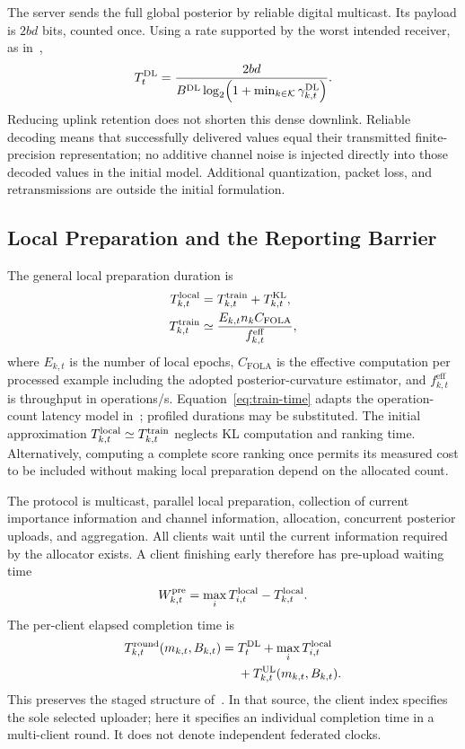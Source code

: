 The server sends the full global posterior by reliable digital multicast. Its payload is $2bd$ bits, counted once. Using a rate supported by the worst intended receiver, as in~\cite[Eqs.~(4)--(5)]{scheduling},
\begin{equation}
 T_t^{\mathrm{DL}}=\frac{2bd}{B^{\mathrm{DL}}\log_2\!\left(
 1+\min_{k\in\mathcal K}\gamma_{k,t}^{\mathrm{DL}}\right)}.
 \label{eq:downlink-time}
\end{equation}
Reducing uplink retention does not shorten this dense downlink. Reliable decoding means that successfully delivered values equal their transmitted finite-precision representation; no additive channel noise is injected directly into those decoded values in the initial model. Additional quantization, packet loss, and retransmissions are outside the initial formulation.

\subsection{Local Preparation and the Reporting Barrier}
The general local preparation duration is
\begin{align}
 T_{k,t}^{\mathrm{local}}
 &=T_{k,t}^{\mathrm{train}}+T_{k,t}^{\mathrm{KL}},\label{eq:local-time}\\
 T_{k,t}^{\mathrm{train}}
 &\simeq\frac{E_{k,t}n_kC_{\mathrm{FOLA}}}
 {f_{k,t}^{\mathrm{eff}}},\label{eq:train-time}
\end{align}
where $E_{k,t}$ is the number of local epochs, $C_{\mathrm{FOLA}}$ is the effective computation per processed example including the adopted posterior-curvature estimator, and $f_{k,t}^{\mathrm{eff}}$ is throughput in operations/s. Equation~\eqref{eq:train-time} adapts the operation-count latency model in~\cite[Eq.~(16)]{scheduling}; profiled durations may be substituted. The initial approximation $T_{k,t}^{\mathrm{local}}\simeq T_{k,t}^{\mathrm{train}}$ neglects KL computation and ranking time. Alternatively, computing a complete score ranking once permits its measured cost to be included without making local preparation depend on the allocated count.

The protocol is multicast, parallel local preparation, collection of current importance information and channel information, allocation, concurrent posterior uploads, and aggregation. All clients wait until the current information required by the allocator exists. A client finishing early therefore has pre-upload waiting time
\begin{equation}
 W_{k,t}^{\mathrm{pre}}
 =\max_iT_{i,t}^{\mathrm{local}}-T_{k,t}^{\mathrm{local}}.
 \label{eq:waiting}
\end{equation}
The per-client elapsed completion time is
\begin{equation}
 \begin{split}
 T_{k,t}^{\mathrm{round}}(m_{k,t},B_{k,t})
 ={}&T_t^{\mathrm{DL}}+\max_iT_{i,t}^{\mathrm{local}}\\
 &+T_{k,t}^{\mathrm{UL}}(m_{k,t},B_{k,t}).
 \end{split}
 \label{eq:round-time}
\end{equation}
This preserves the staged structure of~\cite[Eq.~(18)]{scheduling}. In that source, the client index specifies the sole selected uploader; here it specifies an individual completion time in a multi-client round. It does not denote independent federated clocks.

